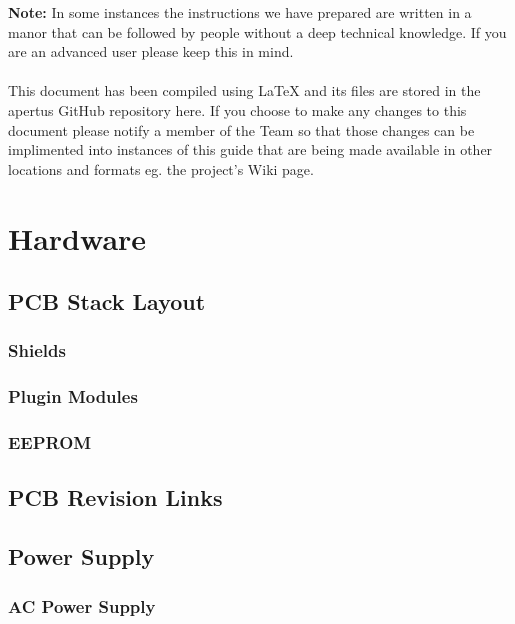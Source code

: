 \documentclass{article}
\begin{document}
\tableofcontents

\vspace*{\fill}
\textbf{Note:} In some instances the instructions we have prepared are written in a manor that can be followed by people without a deep technical knowledge. If you are an advanced user please keep this in mind.\\
\\This document has been compiled using LaTeX and its files are stored in the apertus GitHub repository here. If you choose to make any changes to this document please notify a member of the Team so that those changes can be implimented into instances of this guide that are being made available in other locations and formats eg. the project's Wiki page.















\section{Hardware}
\subsection{PCB Stack Layout}
\subsubsection{Shields}
\subsubsection{Plugin Modules}
\subsubsection{EEPROM}
\subsection{PCB Revision Links}
\subsection{Power Supply}
\subsubsection{AC Power Supply}
\end{document}
